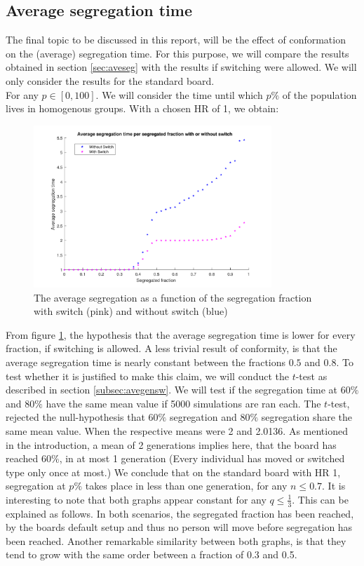 \subsection{Average segregation time}
The final topic to be discussed in this report, will be the effect of conformation on the (average) segregation time. 
For this purpose, we will compare the results obtained in section \ref{sec:aveseg} with the results if switching were allowed. 
We will only consider the results for the standard board.\\
For any \(p\in [0,100]\). We will consider the time until which \(p\%\) of the population lives in homogenous groups. With a chosen HR of 1, we obtain:

\begin{figure}[H]
    \centering
    \includegraphics[width=0.8\textwidth]{Avesegsw2}
    \caption{The average segregation as a function of the segregation fraction with switch (pink) and without switch (blue)}
    \label{fig:avesegsw}
\end{figure}

From figure \ref{fig:avesegsw}, the hypothesis that the average segregation time is lower for every fraction, if switching is allowed. 
A less trivial result of conformity, is that the average segregation time is nearly constant between the fractions \(0.5\) and \(0.8\). 
To test whether it is justified to make this claim, we will conduct the \(t\)-test as described in section \ref{subsec:avegensw}. We will test if the segregation time at \(60\%\) and \(80\%\) have the same mean value if 5000 simulations are ran each. 
The \(t\)-test, rejected the null-hypothesis that \(60\%\) segregation and \(80\%\) segregation share the same mean value. When the respective means were 2 and 2.0136. As mentioned in the introduction, a mean of 2 generations implies here, that the board has reached \(60\%\), in at most 1 generation (Every individual has moved or switched type only once at most.)
We conclude that on the standard board with HR 1, segregation at \(p\%\) takes place in less than one generation, for any \(n\leq 0.7\). 
It is interesting to note that both graphs appear constant for any \(q\leq \frac{1}{3}\). 
This can be explained as follows. In both scenarios, the segregated fraction has been reached, by the boards default setup and thus no person will move before segregation has been reached.
Another remarkable similarity between both graphs, is that they tend to grow with the same order between a fraction of 0.3 and 0.5.
